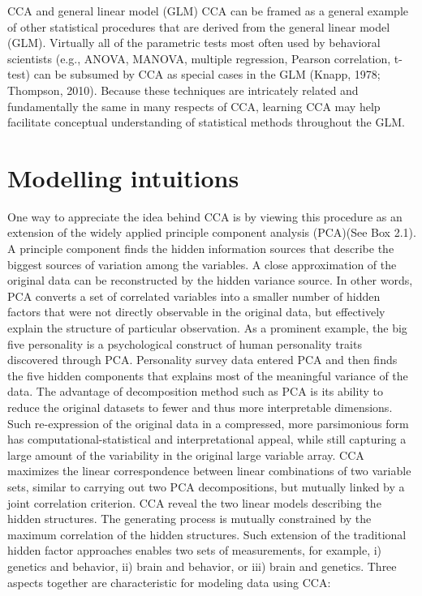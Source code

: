 \newpage
\begin{infobox}{CCA and general linear model (GLM)}
CCA can be framed as a general example of other statistical procedures that are derived from the general linear model (GLM). Virtually all of the parametric tests most often used by behavioral scientists (e.g., ANOVA, MANOVA, multiple regression, Pearson correlation, t-test) can be subsumed by CCA as special cases in the GLM (Knapp, 1978; Thompson, 2010). Because these techniques are intricately related and fundamentally the same in many respects of CCA, learning CCA may help facilitate conceptual understanding of statistical methods throughout the GLM.
\end{infobox}

\section{Modelling intuitions}
\label{methods:intuitions}
One way to appreciate the idea behind CCA is by viewing this procedure as an extension of the widely applied principle component analysis (PCA)(See Box 2.1). A principle component finds the hidden information sources that describe the biggest sources of variation among the variables. A close approximation of the original data can be reconstructed by the hidden variance source. In other words, PCA converts a set of correlated variables into a smaller number of hidden factors that were not directly observable in the original data, but effectively explain the structure of particular observation. As a prominent example, the big five personality is a psychological construct of human personality traits discovered through PCA. Personality survey data entered PCA and then finds the five hidden components that explains most of the meaningful variance of the data. The advantage of decomposition method such as PCA is its ability to reduce the original datasets to fewer and thus more interpretable dimensions. Such re-expression of the original data in a compressed, more parsimonious form has computational-statistical and interpretational appeal, while still capturing a large amount of the variability in the original large variable array. CCA maximizes the linear correspondence between linear combinations of two variable sets, similar to carrying out two PCA decompositions, but mutually linked by a joint correlation criterion. CCA reveal the two linear models describing the hidden structures. The generating process is mutually constrained by the maximum correlation of the hidden structures. Such extension of the traditional hidden factor approaches enables two sets of measurements, for example, i) genetics and behavior, ii) brain and behavior, or iii) brain and genetics. Three aspects together are characteristic for modeling data using CCA:

